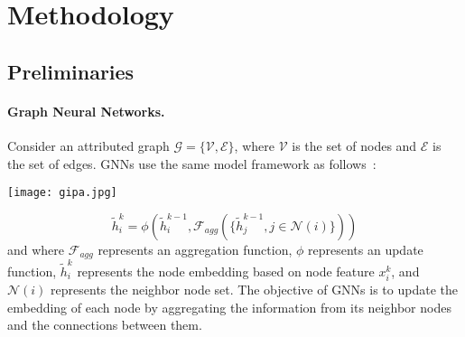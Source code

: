 \documentclass[runningheads]{llncs}
\newcommand{\model}{GIPA\xspace}
\begin{document}
\section{Methodology}
\subsection{Preliminaries}
\paragraph{Graph Neural Networks.} Consider an attributed graph $\mathcal{G}=\{\mathcal{V}, \mathcal{E}\}$, where $\mathcal{V}$ is the set of nodes and $\mathcal{E}$ is the set of edges. GNNs use the same model framework as follows~\cite{hamilton2017inductive,xu2018powerful}:


\begin{figure*}[t!]
    \centering
    \texttt{[image: gipa.jpg]}
    \caption{The architecture of \model, which consists of \textit{attention}, \textit{propagation}, and \textit{aggregation} modules (or processes). The red shadow indicates the bit-wise module and feature-wise module, which extract neighbor information more relevant to the current node through more fine-grained selective information fusion.}
    \label{fig:gipa_process}
\vspace{-0.1cm}
\end{figure*}

\begin{equation}
\label{eq:gnn}
\tilde{h}_i^k=\phi(\tilde{h}_i^{k-1}, \mathcal{F}_{agg}(\{\tilde{h}_j^{k-1}, j\in\mathcal{N}(i)\}))
\end{equation}
and \noindent where $\mathcal{F}_{agg}$ represents an aggregation function, $\phi$ represents an update function, $\tilde{h}_i^k$ represents the node embedding based on node feature $x_i^k$, and $\mathcal{N}(i)$ represents the neighbor node set. The objective of GNNs is to update the embedding of each node by aggregating the information from its neighbor nodes and the connections between them. 
\end{document}
